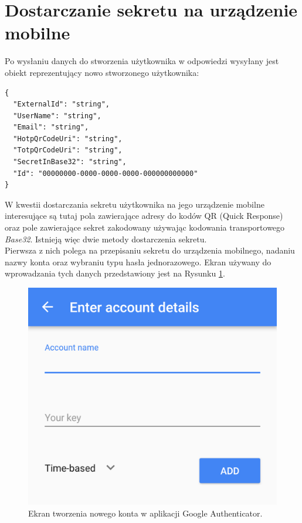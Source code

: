 \section{Dostarczanie sekretu na urządzenie mobilne}
Po wysłaniu danych do stworzenia użytkownika w odpowiedzi wysyłany jest obiekt reprezentujący
nowo stworzonego użytkownika:
\begin{lstlisting}
{
  "ExternalId": "string",
  "UserName": "string",
  "Email": "string",
  "HotpQrCodeUri": "string",
  "TotpQrCodeUri": "string",
  "SecretInBase32": "string",
  "Id": "00000000-0000-0000-0000-000000000000"
}
\end{lstlisting}
W kwestii dostarczania sekretu użytkownika na jego urządzenie mobilne interesujące są tutaj pola
zawierające adresy do kodów QR (Quick Response) oraz pole zawierające sekret zakodowany używając kodowania transportowego \textit{Base32}.
Istnieją więc dwie metody dostarczenia sekretu. \\
Pierwsza z nich polega na przepisaniu sekretu do urządzenia mobilnego, nadaniu nazwy konta oraz wybraniu typu hasła jednorazowego.
Ekran używany do wprowadzania tych danych przedstawiony jest na Rysunku \ref{mobile-manual}.
\begin{figure}[t]
    \centering
	\includegraphics[width=\textwidth]{content/images/mobile-manual}
    \caption{Ekran tworzenia nowego konta w aplikacji Google Authenticator.}
    \label{mobile-manual}
\end{figure} \\
